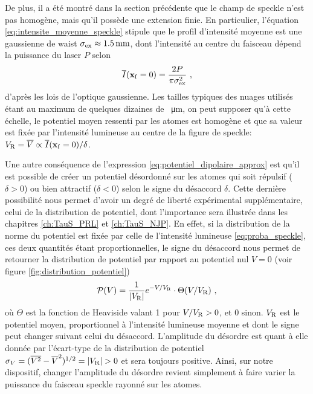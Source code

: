 De plus, il a été montré dans la section précédente que le champ de speckle n'est pas homogène, mais qu'il possède une extension finie. En particulier, l'équation \ref{eq:intensite_moyenne_speckle} stipule que le profil d'intensité moyenne est une gaussienne de waist $\sigma_{\mathrm{ex}}\approx \SI{1.5}{\milli\metre}$, dont l'intensité au centre du faisceau dépend la puissance du laser $P$ selon
\begin{equation}
\overline{I}(\mathbf{x}_{\mathrm{f}}=0)=\frac{2P}{\pi \sigma_{\mathrm{ex}}^2} \text{ ,}
\end{equation}
d'après les lois de l'optique gaussienne. Les tailles typiques des nuages utilisés étant au maximum de quelques dizaines de \SI{}{\micro\metre}, on peut supposer qu'à cette échelle, le potentiel moyen ressenti par les atomes est homogène et que sa valeur est fixée par l'intensité lumineuse au centre de la figure de speckle: $V_{\mathrm{R}}=\overline{V} \propto \overline{I}(\mathbf{x}_{\mathrm{f}}=0)/\delta$.

Une autre conséquence de l'expression \ref{eq:potentiel_dipolaire_approx} est qu'il est possible de créer un potentiel désordonné sur les atomes qui soit répulsif ($\delta>0$) ou bien attractif ($\delta<0$) selon le signe du désaccord $\delta$. Cette dernière possibilité nous permet d'avoir un degré de liberté expérimental supplémentaire, celui de la distribution de potentiel, dont l'importance sera illustrée dans les chapitres \ref{ch:TauS_PRL} et \ref{ch:TauS_NJP}. En effet, si la distribution de la norme du potentiel est fixée par celle de l'intensité lumineuse \ref{eq:proba_speckle}, ces deux quantités étant proportionnelles, le signe du désaccord nous permet de retourner la distribution de potentiel par rapport au potentiel nul $V=0$ (voir figure \ref{fig:distribution_potentiel})
\begin{equation}
\mathcal{P}(V)=\frac{1}{\left| V_{\mathrm{R}} \right|} e^{-V/V_{\mathrm{R}}} \cdot \Theta(V/V_{\mathrm{R}}) \text{ ,}
\label{eq:distribution_potentiel_speckle}
\end{equation}
où $\Theta$ est la fonction de Heaviside valant 1 pour $V/V_{\mathrm{R}}>0$, et 0 sinon. $V_{\mathrm{R}}$ est le potentiel moyen, proportionnel à l'intensité lumineuse moyenne et dont le signe peut changer suivant celui du désaccord. L'amplitude du désordre est quant à elle donnée par l'écart-type de la distribution de potentiel $ \sigma_{V}=(\overline{V^2}-\overline{V}^2)^{1/2}=\left|\VR\right|>0$ et sera toujours positive. Ainsi, sur notre dispositif, changer l'amplitude du désordre revient simplement à faire varier la puissance du faisceau speckle rayonné sur les atomes.


